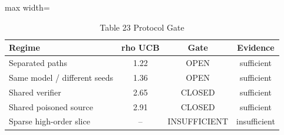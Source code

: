 \begin{table}[tbp]
\centering
\footnotesize
\caption{Table 23 Protocol Gate}
\label{tab:table_23_protocol_gate}
\begin{adjustbox}{max width=\linewidth}
\begin{tabular}{lccc}
\toprule
Regime & rho UCB & Gate & Evidence \\
\midrule
Separated paths & 1.22 & OPEN & sufficient \\
Same model / different seeds & 1.36 & OPEN & sufficient \\
Shared verifier & 2.65 & CLOSED & sufficient \\
Shared poisoned source & 2.91 & CLOSED & sufficient \\
Sparse high-order slice & -- & INSUFFICIENT & insufficient \\
\bottomrule
\end{tabular}
\end{adjustbox}
\end{table}
